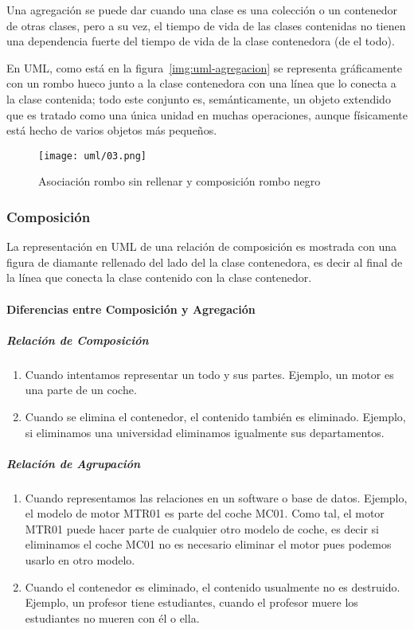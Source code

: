 Una agregación se puede dar cuando una clase es una colección o un contenedor de otras clases, pero a su vez, el tiempo de vida de las clases contenidas no tienen una dependencia fuerte del tiempo de vida de la clase contenedora (de el todo). 


En UML, como está en la figura~\ref{img:uml-agregacion} se representa gráficamente con un rombo hueco junto a la clase contenedora con una línea que lo conecta a la clase contenida; todo este conjunto es, semánticamente, un objeto extendido que es tratado como una única unidad en muchas operaciones, aunque físicamente está hecho de varios objetos más pequeños.

\begin{figure}[H] 
    \centering
    \texttt{[image: uml/03.png]}
    \caption{Asociación rombo sin rellenar y composición rombo negro}
    \label{img:uml-composicion}
\end{figure}

\subsubsection*{Composición}

La representación en UML de una relación de composición es mostrada con una figura de diamante rellenado del lado del la clase contenedora, es decir al final de la línea que conecta la clase contenido con la clase contenedor.


\paragraph*{Diferencias entre Composición y Agregación}

\subparagraph*{Relación de Composición}

\begin{enumerate}
    \item Cuando intentamos representar un todo y sus partes. Ejemplo, un motor es una parte de un coche.
    \item Cuando se elimina el contenedor, el contenido también es eliminado. Ejemplo, si eliminamos una universidad eliminamos igualmente sus departamentos.
\end{enumerate}


\subparagraph*{Relación de Agrupación}

\begin{enumerate}
    \item Cuando representamos las relaciones en un software o base de datos. Ejemplo, el modelo de motor MTR01 es parte del coche MC01. Como tal, el motor MTR01 puede hacer parte de cualquier otro modelo de coche, es decir si eliminamos el coche MC01 no es necesario eliminar el motor pues podemos usarlo en otro modelo.
    \item Cuando el contenedor es eliminado, el contenido usualmente no es destruido. Ejemplo, un profesor tiene estudiantes, cuando el profesor muere los estudiantes no mueren con él o ella.
\end{enumerate}
